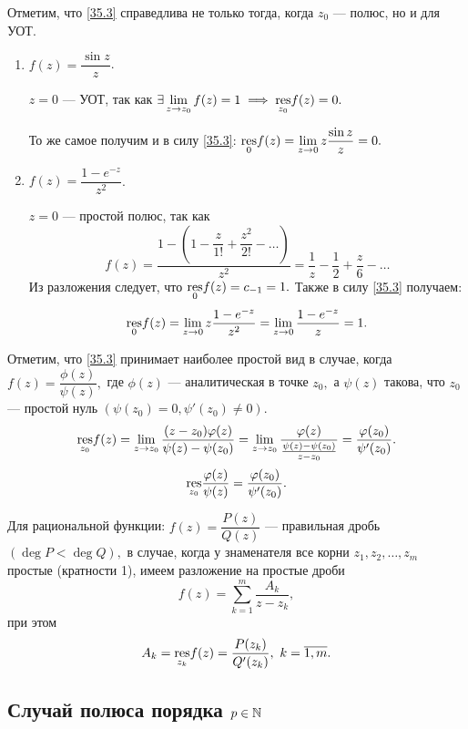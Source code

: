 \documentclass[../../main.tex]{subfiles}
\begin{document}
	Отметим, что \eqref{35.3} справедлива не только тогда, когда $z_0$ --- полюс,
	но и для УОТ.
	
	\begin{examples}
		\;
		
		\begin{enumerate}
			\item 
			$f(z) = \dfrac{\sin z}{z}$.
			
			$ z = 0 $ --- УОТ, так как 
			$\exists \lim\limits_{z\to z_0} f(z) = 1 \implies \underset{z_0}{\operatorname{res}}f(z) = 0.$
			
			То же самое получим и в силу \eqref{35.3}: 
			$\underset{0}{\operatorname{res}}f(z)= \lim\limits_{z\to 0}z \dfrac{\sin z}{z} = 0.$
			\item
			$f(z) = \dfrac{1-e^{-z}}{z^2}$.
			
			$z = 0$ --- простой полюс, так как 
			\[
				f(z) = \dfrac{1- \left(1-\dfrac{z}{1!}+\dfrac{z^2}{2!}-\ldots\right)}{z^2} 
				= \frac{1}{z} - \frac{1}{2} + \frac{z}{6}- \ldots
			\]
			Из разложения следует, что $\underset{0}{\operatorname{res}}f(z) = c_{-1} = 1.$ Также в 
			силу \eqref{35.3} получаем:
			\[
			\underset{0}{\operatorname{res}}f(z) = \lim_{z\to 0}z\dfrac{1-e^{-z}}{z^2} =
			 \lim_{z\to 0}\dfrac{1-e^{-z}}{z} = 1.
			\]
		\end{enumerate}
	\end{examples}
	
	Отметим, что \eqref{35.3} принимает наиболее простой вид в случае, когда 
	$f(z) = \dfrac{\phi(z)}{\psi(z)},$ где 
	$\phi(z)$ --- аналитическая в точке $z_0,$ а $\psi(z)$ такова, что $z_0$ --- 
	простой нуль $({\psi(z_0) = 0, \psi'(z_0) \ne 0}).$
	\[
		\underset{z_0}{\operatorname{res}} f(z) = \lim\limits_{z\to 
		z_0}\frac{(z-z_0)\varphi(z)}{\psi(z) - \psi(z_0)} = 
		\lim\limits_{z\to z_0}\frac{\varphi(z)}{\frac{\psi(z) - \psi(z_0)}{z - z_0}} 
		= \frac{\varphi(z_0)}{\psi'(z_0)}.
	\]
	\begin{equation}\label{35.4}
		\underset{z_0}{\operatorname{res}} \frac{\varphi(z)}{\psi(z)} = 
		\frac{\varphi(z_0)}{\psi'(z_0)}.
	\end{equation}
	
	Для рациональной функции: $f(z) = \dfrac{P(z)}{Q(z)}$ --- правильная 
	дробь $(\deg P < \deg Q),$ в случае, когда у знаменателя все корни $z_1, z_2, 
	\ldots, z_m$ простые (кратности 1), имеем разложение на простые дроби 
	\[
		f(z) = \sum_{k=1}^{m}\frac{A_k}{z-z_k},
	\]
	при этом
	\[
		A_k = 	\underset{z_k}{\res} f(z) = \dfrac{P(z_k)}{Q'(z_k)},\ 
		k = \overline{1, m}.
	\]
	\subsection{Случай полюса порядка $p \in \mathbb{N}$}
	
\end{document}
